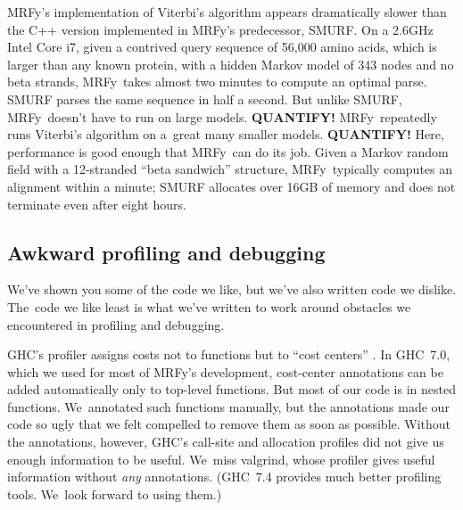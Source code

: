 \documentclass[nonatbib,preprint,blockstyle,times]{sigplanconf}
\newcommand\mrfy{MRFy} %
\newcommand\seclabel[1]{\label{sec:#1}}
\let\cite\citep
\begin{document}
MRFy's implementation of Viterbi's algorithm appears dramatically
slower than the C++ version implemented in \mrfy's predecessor,
SMURF.
On a 2.6GHz Intel Core i7,
given a contrived query sequence of 56,000 amino acids,
which is larger than any known protein,
with a hidden Markov model of 343 nodes and no beta strands,
\mrfy\ takes almost two minutes to compute an optimal parse.
SMURF parses the same sequence in half a second.
But unlike SMURF, \mrfy\ doesn't have to run on large models.
{\large{\textbf{QUANTIFY!}}}
\mrfy\ repeatedly runs Viterbi's algorithm on 
a~great many smaller models.
{\large{\textbf{QUANTIFY!}}}
Here, performance is good enough that \mrfy\ can do its job.
Given a Markov random field with a 12-stranded ``beta sandwich''
structure,
\mrfy\ typically computes an alignment within a minute;
SMURF allocates over 16GB of memory
and does not terminate even after eight hours.
%





\subsection{Awkward profiling and debugging}

\seclabel{awkward-profiling}

We've shown you some of the code we like, but we've also written 
code we dislike.
The~code we like least is what we've written to work around
obstacles we 
encountered in profiling and debugging.

GHC's profiler assigns costs not to functions but to ``cost
centers'' \cite{sansom-pj}.
In GHC~7.0, which we used 
for most of MRFy's development, 
cost-center annotations can be added automatically only
to top-level 
functions.
But most of our code is in nested functions.
We~annotated such functions manually,
but the annotations
made our code so ugly that we felt compelled to
remove them as soon as possible.
Without the annotations, however, GHC's call-site and allocation
profiles did not give us enough information to be useful.
We~miss valgrind, whose profiler gives useful information
without \emph{any} annotations.
(GHC~7.4 provides much
better profiling tools.
We~look forward to using them.)
\end{document}
